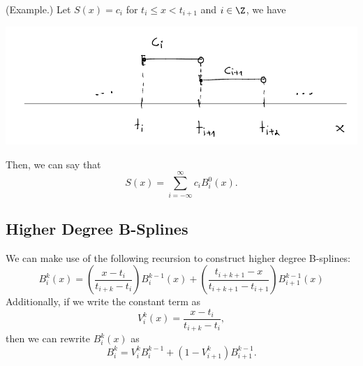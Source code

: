 \documentclass[letterpaper]{article}
\begin{document}
\begin{mdframed}
    (Example.) Let $S(x) = c_i$ for $t_{i} \leq x < t_{i + 1}$ and $i \in \Z$, we have 

    \begin{center}
        \includegraphics[scale=0.5]{../assets/bspline_2.png}
    \end{center}

    Then, we can say that 
    \[S(x) = \sum_{i = -\infty}^{\infty} c_{i} B_{i}^{0}(x).\]
\end{mdframed}

\subsection{Higher Degree B-Splines}
We can make use of the following recursion to construct higher degree B-splines: 
\[B_{i}^{k}(x) = \left(\frac{x - t_i}{t_{i + k} - t_{i}}\right)B_{i}^{k - 1}(x) + \left(\frac{t_{i + k + 1} - x}{t_{i + k + 1} - t_{i + 1}}\right) B_{i + 1}^{k - 1}(x)\]
Additionally, if we write the constant term as 
\[V_{i}^{k}(x) = \frac{x - t_{i}}{t_{i + k} - t_i},\]
then we can rewrite $B_{i}^{k}(x)$ as
\[B_{i}^{k} = V_{i}^{k} B_{i}^{k - 1} + (1 - V_{i + 1}^{k}) B_{i + 1}^{k - 1}.\]
\end{document}
